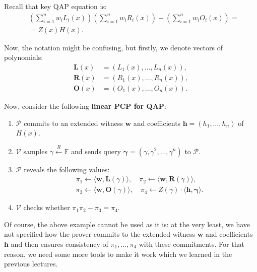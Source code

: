 \documentclass[../lecture-notes.tex]{subfiles}
\begin{document}
\begin{example}
    Recall that key QAP equation is:
    \begin{equation*}
        \begin{aligned}
            &\left(\sum_{i=1}^nw_iL_i(x)\right)\left(\sum_{i=1}^nw_iR_i(x)\right) - \left(\sum_{i=1}^nw_iO_i(x)\right) = \\ &= Z(x)H(x).            
        \end{aligned}
    \end{equation*}

    Now, the notation might be confusing, but firstly, we denote vectors of polynomials: 
    \begin{align*}
        \boldsymbol{L}(x) & = (L_1(x),\dots,L_n(x)), \\
        \boldsymbol{R}(x) & = (R_1(x),\dots,R_n(x)), \\
        \boldsymbol{O}(x) & = (O_1(x),\dots,O_n(x)).
    \end{align*}
    
    Now, consider the following \textbf{linear PCP for QAP}:
    \begin{enumerate}
        \item $\mathcal{P}$ commits to an extended witness $\mathbf{w}$ and coefficients $\mathbf{h} = (h_1,\dots,h_n)$ of $H(x)$.
        \item $\mathcal{V}$ samples $\gamma \xleftarrow{R} \mathbb{F}$ and sends query $\boldsymbol{\gamma} = (\gamma,\gamma^2,\dots,\gamma^n)$ to $\mathcal{P}$.
        \item $\mathcal{P}$ reveals the following values:
        \begin{equation*}
            \begin{aligned}
                &\pi_1 \gets \langle \mathbf{w}, \boldsymbol{L}(\gamma) \rangle, \quad \pi_2 \gets \langle \mathbf{w}, \boldsymbol{R}(\gamma) \rangle, \quad \\ & \pi_3 \gets \langle \mathbf{w}, \boldsymbol{O}(\gamma) \rangle, \quad \pi_4 \gets Z(\gamma) \cdot \langle \mathbf{h}, \boldsymbol{\gamma} \rangle.                
            \end{aligned}
        \end{equation*}
        \item $\mathcal{V}$ checks whether $\pi_1\pi_2 - \pi_3 = \pi_4$.
    \end{enumerate}
\end{example}

Of course, the above example cannot be used as it is: at the very least, we have not specified how the prover commits to the extended witness $\mathbf{w}$ and coefficients $\mathbf{h}$ and then ensures consistency of $\pi_1,\dots,\pi_4$ with these commitments. For that reason, we need some more tools to make it work which we learned in the previous lectures.
\end{document}
